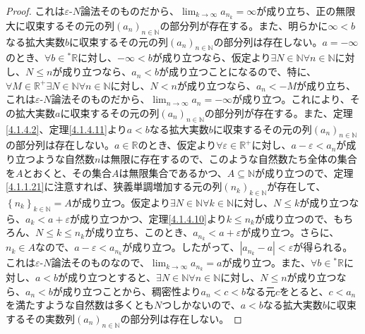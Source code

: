 \documentclass[dvipdfmx]{jsarticle}
\begin{document}
\begin{proof}
これは$\varepsilon$-$N$論法そのものだから、$\lim_{k \rightarrow \infty}a_{n_{k}} = \infty$が成り立ち、正の無限大に収束するその元の列$\left( a_{n} \right)_{n \in \mathbb{N}}$の部分列が存在する。また、明らかに$\infty < b$なる拡大実数$b$に収束するその元の列$\left( a_{n} \right)_{n \in \mathbb{N}}$の部分列は存在しない。$a = - \infty$のとき、$\forall b \in{}^{*}\mathbb{R}$に対し、$- \infty < b$が成り立つなら、仮定より$\exists N \in \mathbb{N}\forall n \in \mathbb{N}$に対し、$N \leq n$が成り立つなら、$a_{n} < b$が成り立つことになるので、特に、$\forall M \in \mathbb{R}^{+}\exists N \in \mathbb{N}\forall n \in \mathbb{N}$に対し、$N < n$が成り立つなら、$a_{n} < - M$が成り立ち、これは$\varepsilon$-$N$論法そのものだから、$\lim_{n \rightarrow \infty}a_{n} = - \infty$が成り立つ。これにより、その拡大実数$a$に収束するその元の列$\left( a_{n} \right)_{n \in \mathbb{N}}$の部分列が存在する。また、定理\ref{4.1.4.2}、定理\ref{4.1.4.11}より$a < b$なる拡大実数$b$に収束するその元の列$\left( a_{n} \right)_{n \in \mathbb{N}}$の部分列は存在しない。$a \in \mathbb{R}$のとき、仮定より$\forall\varepsilon \in \mathbb{R}^{+}$に対し、$a - \varepsilon < a_{n}$が成り立つような自然数$n$は無限に存在するので、このような自然数たち全体の集合を$A$とおくと、その集合$A$は無限集合であるかつ、$A \subseteq \mathbb{N}$が成り立つので、定理\ref{4.1.1.21}に注意すれば、狭義単調増加する元の列$\left( n_{k} \right)_{k \in \mathbb{N}}$が存在して、$\left\{ n_{k} \right\}_{k \in \mathbb{N}} = A$が成り立つ。仮定より$\exists N \in \mathbb{N}\forall k \in \mathbb{N}$に対し、$N \leq k$が成り立つなら、$a_{k} < a + \varepsilon$が成り立つかつ、定理\ref{4.1.4.10}より$k \leq n_{k}$が成り立つので、もちろん、$N \leq k \leq n_{k}$が成り立ち、このとき、$a_{n_{k}} < a + \varepsilon$が成り立つ。さらに、$n_{k} \in A$なので、$a - \varepsilon < a_{n_{k}}$が成り立つ。したがって、$\left| a_{n_{k}} - a \right| < \varepsilon$が得られる。これは$\varepsilon$-$N$論法そのものなので、$\lim_{k \rightarrow \infty}a_{n_{k}} = a$が成り立つ。また、$\forall b \in{}^{*}\mathbb{R}$に対し、$a < b$が成り立つとすると、$\exists N \in \mathbb{N}\forall n \in \mathbb{N}$に対し、$N \leq n$が成り立つなら、$a_{n} < b$が成り立つことから、稠密性より$a_{n} < c < b$なる元$c$をとると、$c < a_{n}$を満たすような自然数は多くとも$N$つしかないので、$a < b$なる拡大実数$b$に収束するその実数列$\left( a_{n} \right)_{n \in \mathbb{N}}$の部分列は存在しない。\par

\end{proof}
\end{document}
